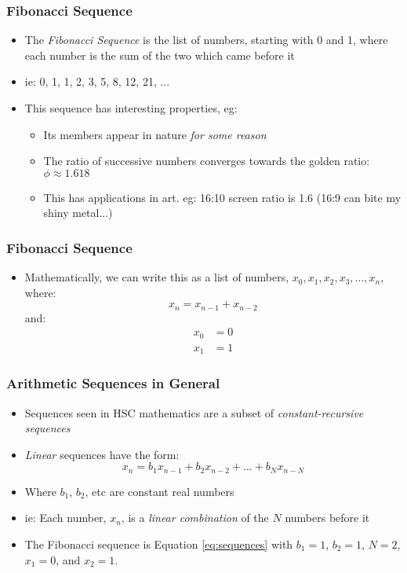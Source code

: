 \documentclass[14pt]{beamer}
\begin{document}
\begin{frame}
\frametitle{Fibonacci Sequence}
\begin{itemize}
\item The \textit{Fibonacci Sequence} is the list of numbers, starting with 0 and 1, where each number is the sum of the two which came before it

\item ie: 0, 1, 1, 2, 3, 5, 8, 12, 21, ...

\item This sequence has interesting properties, eg:
	\begin{itemize}
		\item Its members appear in nature \textit{for some reason}
		\item The ratio of successive numbers converges towards the golden ratio: $\phi \approx 1.618$
		\item This has applications in art. eg: 16:10 screen ratio is 1.6 (16:9 can bite my shiny metal...)
	\end{itemize}
\end{itemize}
\end{frame}

\begin{frame}
\frametitle{Fibonacci Sequence}
\begin{itemize}
\item Mathematically, we can write this as a list of numbers, $x_0,x_1, x_2, x_3, ... , x_n$, where:
\begin{equation}
x_n = x_{n-1} + x_{n-2}
\end{equation}
and:
\begin{align}
x_0 &= 0\\
x_1 &= 1
\end{align}
\end{itemize}
\end{frame}

\begin{frame}
\frametitle{Arithmetic Sequences in General}
\begin{itemize}
\item Sequences seen in HSC mathematics are a subset of \textit{constant-recursive sequences}
\item \textit{Linear} sequences have the form:
\begin{equation}\label{eq:sequences}
x_n = b_1x_{n-1} + b_2x_{n-2} + ... + b_Nx_{n-N}
\end{equation}
\item Where $b_1$, $b_2$, etc are constant real numbers
\item ie: Each number, $x_n$, is a \textit{linear combination} of the $N$ numbers before it
\item The Fibonacci sequence is Equation \eqref{eq:sequences} with $b_1 = 1$, $b_2 = 1$, $N = 2$, $x_1 = 0$, and $x_2 = 1$.
\end{itemize}
\end{frame}
\end{document}
